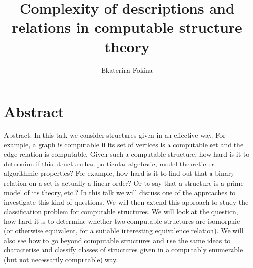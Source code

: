 \documentclass[11pt]{amsart}
\title{Complexity of descriptions and relations in computable structure theory}
\author{Ekaterina Fokina}
\begin{document}
\maketitle

\section*{Abstract}

Abstract: In this talk we consider structures given in an effective way. For example, a graph is computable if its set of vertices is a computable set and the edge relation is computable. Given such a computable structure, how hard is it to determine if this structure has particular algebraic, model-theoretic or algorithmic properties? For example, how hard is it to find out that a binary relation on a set is actually a linear order? Or to say that a structure is a prime model of its theory, etc.? In this talk we will discuss one of the approaches to investigate this kind of questions. We will then extend this approach to study the classification problem for computable structures. We will look at the question, how hard it is to determine whether two computable structures are isomorphic (or otherwise equivalent, for a suitable interesting equivalence relation). We will also see how to go beyond computable structures and use the same ideas to characterise and classify classes of structures given in a computably enumerable (but not necessarily computable) way.
\end{document}
